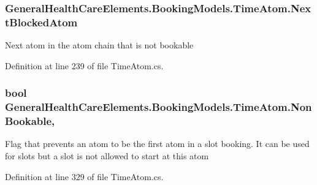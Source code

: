 \subsubsection[{\texorpdfstring{Next\+Blocked\+Atom}{NextBlockedAtom}}]{ General\+Health\+Care\+Elements.\+Booking\+Models.\+Time\+Atom.\+Next\+Blocked\+Atom\hspace{0.3cm}{\ttfamily [get]}}\hypertarget{class_general_health_care_elements_1_1_booking_models_1_1_time_atom_ad15044a1ef9707201d76dbc1d988932f}{}\label{class_general_health_care_elements_1_1_booking_models_1_1_time_atom_ad15044a1ef9707201d76dbc1d988932f}


Next atom in the atom chain that is not bookable 



Definition at line 239 of file Time\+Atom.\+cs.

\subsubsection[{\texorpdfstring{Non\+Bookable}{NonBookable}}]{\setlength{\rightskip}{0pt plus 5cm}bool General\+Health\+Care\+Elements.\+Booking\+Models.\+Time\+Atom.\+Non\+Bookable\hspace{0.3cm}{\ttfamily [get]}, {\ttfamily [set]}}\hypertarget{class_general_health_care_elements_1_1_booking_models_1_1_time_atom_a32b761cdef478ffe5c44fa9e82378588}{}\label{class_general_health_care_elements_1_1_booking_models_1_1_time_atom_a32b761cdef478ffe5c44fa9e82378588}


Flag that prevents an atom to be the first atom in a slot booking. It can be used for slots but a slot is not allowed to start at this atom 



Definition at line 329 of file Time\+Atom.\+cs.

